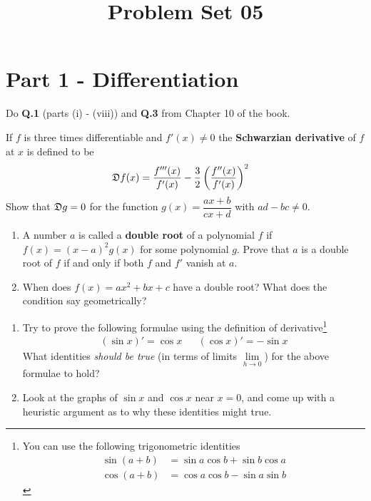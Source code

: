 \documentclass[9pt, a4paper, oneside]{amsart}
\title{Problem Set 05}
\begin{document}
\maketitle
\thispagestyle{fancy}


\section*{Part 1 - Differentiation}
\begin{questions}
	\item Do \textbf{Q.1} (parts (i) - (viii)) and \textbf{Q.3} from Chapter 10 of the book.

	\item If $ f$ is three times differentiable and $ f'(x) \neq 0$ the \textbf{Schwarzian derivative} of $ f$ at $ x$ is defined to be
	\begin{align*}
		\frak{D}f(x) & = \dfrac{f'''(x)}{f'(x)} - \dfrac{3}{2} \left(\dfrac{f''(x)}{f'(x)}\right)^2
	\end{align*}
	Show that $ \frak{D}g=0$ for the function $ g(x) = \dfrac{ax + b}{cx + d}$ with $ ad - bc \neq 0$.

	\item
	\begin{enumerate}
		\item A number $ a$ is called a \textbf{double root} of a polynomial $ f$ if $ f(x) = (x-a)^2 g(x)$ for some polynomial $ g$. Prove that $ a$ is a double root of $ f$ if and only if both $ f$ and $ f'$ vanish at $ a$.
		\item When does $ f(x) = ax^2 + bx + c$ have a double root? What does the condition say geometrically?
	\end{enumerate}


	\item
	\begin{enumerate}\item Try to prove the following formulae using the definition of derivative\footnote{You can use the following trigonometric identities
			\begin{align*}
				\sin(a + b) & = \sin a \cos b + \sin b \cos a \\
				\cos(a + b) & = \cos a \cos b - \sin a \sin b
			\end{align*}}
		\begin{align*}
			(\sin x)' = \cos x &   & (\cos x)' = -\sin x
		\end{align*}
		What identities \emph{should be true} (in terms of limits $ \lim \limits_{h \rightarrow 0}$) for the above formulae to hold?
		\item Look at the graphs of $ \sin x$ and $ \cos x$ near $ x=0$, and come up with a {heuristic argument} as to why these identities might true.
	\end{enumerate}
\end{questions}
\end{document}
